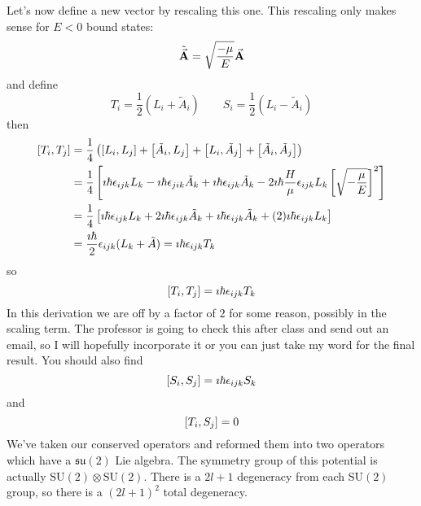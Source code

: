 \documentclass[a4paper,twoside,master.tex]{subfiles}
\begin{document}
Let's now define a new vector by rescaling this one. This rescaling only makes sense for $ E < 0 $ bound states:
\begin{equation}
    \tilde{\va{A}} = \sqrt{\frac{- \mu}{E}} \va{A}
\end{equation}
and define
\begin{equation}
    T_i = \frac{1}{2} (L_i + \tilde{A}_i) \qquad S_i = \frac{1}{2} (L_i - \tilde{A}_i)
\end{equation}
then
\begin{align}
    \comm{T_i}{T_j} &= \frac{1}{4} \left( \comm{L_i}{L_j} + \comm{\tilde{A}_i}{L_j} + \comm{L_i}{\tilde{A}_j} + \comm{\tilde{A}_i}{\tilde{A}_j} \right) \\
    &= \frac{1}{4} \left[ \imath \hbar \epsilon_{ijk} L_k - \imath \hbar \epsilon_{jik} \tilde{A}_k + \imath \hbar \epsilon_{ijk} \tilde{A}_k - 2 \imath \hbar \frac{H}{\mu} \epsilon_{ijk} L_k \left[ \sqrt{- \frac{\mu}{E}} \right]^2 \right] \\
    &= \frac{1}{4} \left[ \imath \hbar \epsilon_{ijk} L_k + 2 \imath \hbar \epsilon_{ijk} \tilde{A}_k + \imath \hbar \epsilon_{ijk} \tilde{A}_k + (2) \imath \hbar \epsilon_{ijk} L_k \right] \\
    &= \frac{\imath \hbar}{2} \epsilon_{ijk} (L_k + \tilde{A}) = \imath \hbar \epsilon_{ijk} T_k
\end{align}
so
\begin{equation}
    \comm{T_i}{T_j} = \imath \hbar \epsilon_{ijk} T_k
\end{equation}
In this derivation we are off by a factor of $ 2 $ for some reason, possibly in the scaling term. The professor is going to check this after class and send out an email, so I will hopefully incorporate it or you can just take my word for the final result. You should also find
\begin{equation}
    \comm{S_i}{S_j} = \imath \hbar \epsilon_{ijk} S_k
\end{equation}
and
\begin{equation}
    \comm{T_i}{S_j} = 0
\end{equation}
We've taken our conserved operators and reformed them into two operators which have a $\mathfrak{su}(2)$ Lie algebra. The symmetry group of this potential is actually $ \text{SU}(2) \otimes \text{SU}(2) $. There is a $ 2l+1 $ degeneracy from each $\text{SU}(2)$ group, so there is a $ (2l+1)^2 $ total degeneracy.
\end{document}
